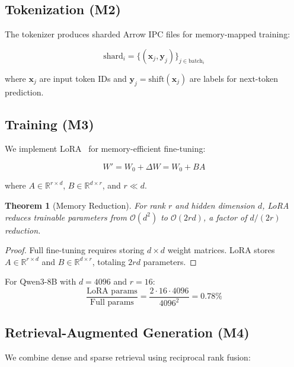 \documentclass[11pt,a4paper]{article}
\theoremstyle{plain}
\newtheorem{theorem}{Theorem}[section]
\theoremstyle{definition}
\newcommand{\R}{\mathbb{R}}
\newcommand{\calO}{\mathcal{O}}
\begin{document}
\subsection{Tokenization (M2)}

The tokenizer produces sharded Arrow IPC files for memory-mapped training:

\begin{equation}
    \text{shard}_i = \{(\mathbf{x}_j, \mathbf{y}_j)\}_{j \in \text{batch}_i}
\end{equation}

where $\mathbf{x}_j$ are input token IDs and $\mathbf{y}_j = \text{shift}(\mathbf{x}_j)$
are labels for next-token prediction.

\subsection{Training (M3)}

We implement LoRA~\cite{hu2022lora} for memory-efficient fine-tuning:

\begin{equation}
    W' = W_0 + \Delta W = W_0 + BA
    \label{eq:lora}
\end{equation}

where $A \in \R^{r \times d}$, $B \in \R^{d \times r}$, and $r \ll d$.

\begin{theorem}[Memory Reduction]
For rank $r$ and hidden dimension $d$, LoRA reduces trainable parameters from
$\calO(d^2)$ to $\calO(2rd)$, a factor of $d/(2r)$ reduction.
\end{theorem}

\begin{proof}
Full fine-tuning requires storing $d \times d$ weight matrices. LoRA stores
$A \in \R^{r \times d}$ and $B \in \R^{d \times r}$, totaling $2rd$ parameters.
\end{proof}

For Qwen3-8B with $d = 4096$ and $r = 16$:
\begin{equation}
    \frac{\text{LoRA params}}{\text{Full params}} = \frac{2 \cdot 16 \cdot 4096}{4096^2} = 0.78\%
\end{equation}

\subsection{Retrieval-Augmented Generation (M4)}

We combine dense and sparse retrieval using reciprocal rank fusion:
\end{document}

